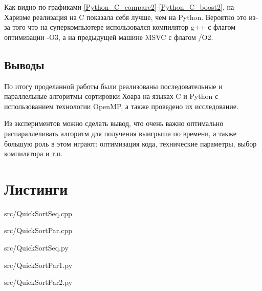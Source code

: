 \documentclass[a4paper,oneside,14pt]{extreport}
\begin{document}
Как видно по графиками \ref{Python_C_compare2}-\ref{Python_C_boost2}, на Харизме реализация на C показала себя лучше, чем на Python. Вероятно это из-за того что на суперкомпьютере использовался компилятор g++ с флагом оптимизации -O3, а на предыдущей машине MSVC с флагом /O2.

\section*{Выводы}
По итогу проделанной работы были реализованы последовательные и параллельные алгоритмы сортировки Хоара на языках C и Python с использованием технологии OpenMP, а также проведено их исследование.

Из экспериментов можно сделать вывод, что очень важно оптимально распараллеливать алгоритм для получения выигрыша по времени, а также большую роль в этом играют: оптимизация кода, технические параметры, выбор компилятора и т.п. 

\chapter*{Листинги}

\begin{lstinputlisting}[
	caption={Последовательный алгоритм сортировки Хоара на языке C},
	label={QuickSortSeq.cpp},
	style={c},
	]{src/QuickSortSeq.cpp}
\end{lstinputlisting}

\begin{lstinputlisting}[
caption={Параллельные алгоритмы сортировки Хоара на языке C},
label={QuickSortPar.cpp},
style={c},
]{src/QuickSortPar.cpp}
\end{lstinputlisting}

\newpage
\begin{lstinputlisting}[
	caption={Последовательные алгоритм сортировки Хоара на языке Python},
	label={QuickSortSeq.py},
	style={c},
	language={Python}
	]{src/QuickSortSeq.py}
\end{lstinputlisting}

\newpage
\begin{lstinputlisting}[
caption={Параллельный алгоритм сортировки Хоара на языке Python с использованием numba},
label={QuickSortPar1.py},
style={c},
language={Python}
]{src/QuickSortPar1.py}
\end{lstinputlisting}

\newpage
\begin{lstinputlisting}[
caption={Параллельный алгоритм сортировки Хоара на языке Python с использованием numba.openmp},
label={QuickSortPar2.py},
style={c},
language={Python}
]{src/QuickSortPar2.py}
\end{lstinputlisting}
\end{document}
